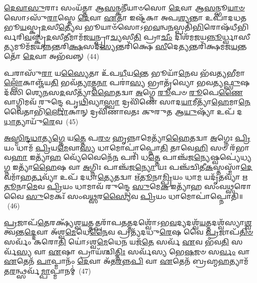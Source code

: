 \-\ul{𑌦𑍇}\-\-\ul{𑌵𑌾}\-\-\ul{𑌸𑍁}\-𑌰𑌾𑌃 𑌸𑌂𑌯᳴𑌤𑍍𑌤𑌾 𑌆\-\ul{𑌸}\-𑌨𑍍𑌕𑌨𑍀᳴𑌯𑌾𑍞𑌸𑍋 \ul{𑌦𑍇}\-𑌵𑌾 𑌆\-\ul{𑌸}\-𑌨𑍍𑌭𑍂\-\ul{𑌯𑌾}\-\-\ul{𑍞}\-𑌸𑍋\-𑌽𑌸𑍁᳴\-\ul{𑌰𑌾}\-𑌸𑍍𑌤𑍇 \ul{𑌦𑍇}\-𑌵𑌾 \ul{𑌏}\-𑌤𑌾 𑌇𑌷𑍍𑌟᳴𑌕𑌾 𑌅𑌪\-\ul{𑌶𑍍𑌯}\-𑌨𑍍𑌤𑌾 𑌉𑌪𑌾᳴𑌦𑌧𑌤 𑌭𑍂\-\ul{𑌯}\-𑌸𑍍𑌕𑍃\-\ul{𑌦}\-𑌸𑍀\-\ul{𑌤𑍍𑌯𑍇}\-𑌵 𑌭𑍂𑌯𑌾𑍞᳴𑌸𑍋\-𑌽𑌭\-\ul{𑌵}\-𑌨𑍍𑌵\-\ul{𑌨}\-𑌸𑍍𑌪𑌤𑌿᳴\-\ul{𑌭𑌿}\-𑌰𑍋𑌷᳴𑌧𑍀𑌭𑌿𑌰𑍍𑌵𑌰𑌿\-\ul{𑌵}\-𑌸𑍍𑌕𑍃\-\ul{𑌦}\-𑌸𑍀\-\ul{𑌤𑍀}\-𑌮𑌾𑌮᳴𑌜\-\ul{𑌯}\-𑌨𑍍𑌪𑍍𑌰𑌾\-\ul{𑌚𑍍𑌯}\-𑌸𑍀\-\ul{𑌤𑌿} 𑌪𑍍𑌰𑌾\-\ul{𑌚𑍀𑌂} 𑌦𑌿𑌶᳴𑌮𑌜𑌯\-\ul{𑌨𑍍𑌨𑍂}\-𑌰𑍍𑌧𑍍𑌵𑌾𑌸𑍀\-\ul{𑌤𑍍𑌯}\-𑌮𑍂𑌮᳴𑌜𑌯𑌨𑍍𑌨𑌨𑍍𑌤𑌰𑌿\-\ul{𑌕𑍍𑌷}\-𑌸𑌦᳴\-\ul{𑌸𑍍𑌯}\-𑌨𑍍𑌤𑌰𑌿᳴𑌕𑍍𑌷𑍇 \ul{𑌸𑍀}\-𑌦𑍇\-\ul{𑌤𑍍𑌯}\-𑌨𑍍𑌤𑌰𑌿᳴𑌕𑍍𑌷𑌮𑌜\-\ul{𑌯}\-𑌨𑍍𑌤𑌤𑍋᳴ \ul{𑌦𑍇}\-𑌵𑌾 𑌅𑌭᳴𑌵𑌨𑍍𑌨𑍍~(44)

𑌪𑌰𑌾𑌸𑍁᳴\-\ul{𑌰𑌾} 𑌯\-\ul{𑌸𑍍𑌯𑍈}\-𑌤𑌾 𑌉᳴𑌪\-\ul{𑌧𑍀}\-𑌯\-\ul{𑌨𑍍𑌤𑍇} 𑌭𑍂𑌯𑌾᳴\-\ul{𑌨𑍇}\-𑌵 𑌭᳴𑌵\-\ul{𑌤𑍍𑌯}\-𑌭𑍀𑌮𑌾\-\ul{𑌲𑍍𑌲𑍋𑌁}\-𑌕𑌾𑌞𑍍𑌜᳴𑌯\-\ul{𑌤𑌿} 𑌭𑌵᳴\-\ul{𑌤𑍍𑌯𑌾}\-𑌤𑍍𑌮\-\ul{𑌨𑌾} 𑌪𑌰𑌾॑\-\ul{𑌸𑍍𑌯} 𑌭𑍍𑌰𑌾𑌤𑍃᳴𑌵𑍍𑌯𑍋 𑌭𑌵𑌤𑍍𑌯\-\ul{𑌫𑍍𑌸𑍁}\-𑌷𑌦᳴𑌸𑌿 𑌶𑍍𑌯𑍇\-\ul{𑌨}\-𑌸\-\ul{𑌦}\-𑌸𑍀𑌤𑍍𑌯𑌾᳴\-\ul{𑌹𑍈}\-𑌤𑌦𑍍𑌵𑌾 \ul{𑌅}\-𑌗𑍍𑌨𑍇 \ul{𑌰𑍂}\-𑌪𑍞 \ul{𑌰𑍂}\-𑌪𑍇\-\ul{𑌣𑍈}\-𑌵𑌾𑌗𑍍𑌨𑌿𑌮𑌵᳴ 𑌰𑍁𑌨𑍍𑌦𑍍𑌧𑍇 𑌪𑍃\-\ul{𑌥𑌿}\-𑌵𑍍𑌯𑌾\-\ul{𑌸𑍍𑌤𑍍𑌵𑌾} 𑌦𑍍𑌰𑌵𑌿᳴𑌣𑍇 𑌸𑌾𑌦\-\ul{𑌯𑌾}\-𑌮𑍀𑌤𑍍𑌯𑌾᳴\-\ul{𑌹𑍇}\-𑌮𑌾\-\ul{𑌨𑍇}\-𑌵𑍈𑌤𑌾𑌭𑌿᳴\-\ul{𑌰𑍍𑌲𑍋}\-𑌕𑌾𑌨𑍍 𑌦𑍍𑌰𑌵𑌿᳴𑌣𑌾𑌵𑌤𑌃 𑌕𑍁𑌰𑍁𑌤 𑌆\-\ul{𑌯𑍁}\-𑌷𑍍𑌯𑌾᳴ 𑌉𑌪᳴ 𑌦\-\ul{𑌧𑌾}\-𑌤𑍍𑌯𑌾𑌯𑍁᳴\-\ul{𑌰𑍇}\-𑌵~(45)

\-\ul{𑌅}\-\-\ul{𑌸𑍍𑌮𑌿}\-\-\ul{𑌨𑍍𑌦}\-\-\ul{𑌧𑌾}\-𑌤𑍍𑌯\-\ul{𑌗𑍍𑌨𑍇} 𑌯\-\ul{𑌤𑍍𑌤𑍇} 𑌪\-\ul{𑌰}\-\-\ul{𑍞} 𑌹𑍃𑌨𑍍𑌨𑌾𑌮𑍇𑌤𑍍𑌯𑌾᳴\-\ul{𑌹𑍈}\-𑌤𑌦𑍍𑌵𑌾 \ul{𑌅}\-𑌗𑍍𑌨𑍇𑌃 \ul{𑌪𑍍𑌰𑌿}\-𑌯𑌂 𑌧𑌾𑌮᳴ \ul{𑌪𑍍𑌰𑌿}\-𑌯\-\ul{𑌮𑍇}\-𑌵𑌾\-\ul{𑌸𑍍𑌯} 𑌧𑌾𑌮𑍋𑌪𑌾॑𑌪𑍍𑌨𑍋\-\ul{𑌤𑌿} 𑌤𑌾𑌵𑍇\-\ul{𑌹𑌿} 𑌸𑍞 𑌰᳴𑌭𑌾𑌵\-\ul{𑌹𑌾} 𑌇𑌤𑍍𑌯𑌾᳴\-\ul{𑌹} 𑌵𑍍𑌯𑍇᳴𑌵𑍈𑌨𑍇᳴\-\ul{𑌨} 𑌪𑌰𑌿᳴ 𑌧\-\ul{𑌤𑍍𑌤𑍇} 𑌪𑌾𑌞𑍍𑌚᳴𑌜\-\ul{𑌨𑍍𑌯𑍇}\-𑌷𑍍𑌵𑌪𑍍𑌯𑍇॑𑌧𑍍𑌯\-\ul{𑌗𑍍𑌨} 𑌇𑌤𑍍𑌯𑌾᳴\-\ul{𑌹𑍈}\-𑌷 𑌵𑌾 \ul{𑌅}\-𑌗𑍍𑌨𑌿𑌃 𑌪𑌾𑌞𑍍𑌚᳴𑌜\-\ul{𑌨𑍍𑌯𑍋} 𑌯𑌃 𑌪𑌞𑍍𑌚᳴𑌚𑌿𑌤𑍀\-\ul{𑌕}\-𑌸𑍍𑌤𑌸𑍍𑌮𑌾᳴\-\ul{𑌦𑍇}\-𑌵𑌮𑌾᳴𑌹\-\ul{𑌰𑍍𑌤}\-𑌵𑍍𑌯𑌾᳴ 𑌉𑌪᳴ 𑌦𑌧𑌾\-\ul{𑌤𑍍𑌯𑍇}\-𑌤𑌦𑍍𑌵𑌾 𑌋᳴\-\ul{𑌤𑍂}\-𑌨𑌾\-\ul{𑌮𑍍𑌪𑍍𑌰𑌿}\-𑌯𑌂 𑌧𑌾\-\ul{𑌮} 𑌯𑌦𑍃᳴\-\ul{𑌤}\-𑌵𑍍𑌯𑌾᳴ 𑌋\-\ul{𑌤𑍂}\-𑌨𑌾\-\ul{𑌮𑍇}\-𑌵 \ul{𑌪𑍍𑌰𑌿}\-𑌯𑌂 𑌧𑌾𑌮𑌾𑌵᳴ 𑌰𑍁𑌨𑍍𑌦𑍍𑌧𑍇 \ul{𑌸𑍁}\-𑌮𑍇\-\ul{𑌕} 𑌇𑌤𑍍𑌯𑌾᳴𑌹 𑌸𑌂𑌵\-\ul{𑌥𑍍𑌸}\-𑌰𑍋 𑌵𑍈 \ul{𑌸𑍁}\-𑌮𑍇𑌕𑌃᳴ 𑌸𑌂𑌵\-\ul{𑌥𑍍𑌸}\-𑌰\-\ul{𑌸𑍍𑌯𑍈}\-𑌵 \ul{𑌪𑍍𑌰𑌿}\-𑌯𑌂 𑌧𑌾𑌮𑍋𑌪𑌾॑𑌪𑍍𑌨𑍋𑌤𑌿॥~(46)

{\anuvakamend[{𑌅𑌭᳴\-\ul{𑌵}\-𑌨𑍍𑌨𑌾𑌯𑍁᳴\-\ul{𑌰𑍇}\-𑌵\-\ul{𑌰𑍍𑌤}\-𑌵𑍍𑌯𑌾᳴ 𑌉\-\ul{𑌪} 𑌷𑌡𑍍𑌵𑌿𑍞᳴𑌶𑌤𑌿𑌶𑍍𑌚}]}%

\-\ul{𑌪𑍍𑌰}\-𑌜𑌾𑌪᳴\-\ul{𑌤𑍇}\-𑌰𑌕𑍍𑌷𑍍𑌯᳴𑌶𑍍𑌵\-\ul{𑌯}\-𑌤𑍍𑌤𑌤𑍍𑌪𑌰𑌾᳴𑌪\-\ul{𑌤}\-𑌤𑍍𑌤𑌦𑌶𑍍𑌵𑍋᳴\-𑌽𑌭\-\ul{𑌵}\-𑌦𑍍𑌯𑌦𑌶𑍍𑌵᳴\-\ul{𑌯}\-𑌤𑍍𑌤𑌦𑌶𑍍𑌵᳴𑌸𑍍𑌯𑌾\-\ul{𑌶𑍍𑌵}\-𑌤𑍍𑌵𑌨𑍍𑌤\-\ul{𑌦𑍍𑌦𑍇}\-𑌵𑌾 𑌅᳴𑌶𑍍𑌵\-\ul{𑌮𑍇}\-𑌧𑍇\-\ul{𑌨𑍈}\-𑌵 𑌪𑍍𑌰𑌤𑍍𑌯᳴𑌦𑌧𑍁\-\ul{𑌰𑍇}\-𑌷 𑌵𑍈 \ul{𑌪𑍍𑌰}\-𑌜𑌾𑌪᳴\-\ul{𑌤𑌿}\-\-\ul{𑍞} 𑌸𑌰𑍍𑌵𑌂᳴ 𑌕𑌰𑍋\-\ul{𑌤𑌿} 𑌯𑍋॑\-𑌽𑌶𑍍𑌵\-\ul{𑌮𑍇}\-𑌧𑍇\-\ul{𑌨} 𑌯𑌜᳴\-\ul{𑌤𑍇} 𑌸𑌰𑍍𑌵᳴ \ul{𑌏}\-𑌵 𑌭᳴𑌵\-\ul{𑌤𑌿} 𑌸𑌰𑍍𑌵᳴\-\ul{𑌸𑍍𑌯} 𑌵𑌾 \ul{𑌏}\-𑌷𑌾 𑌪𑍍𑌰𑌾𑌯᳴𑌶𑍍𑌚𑌿\-\ul{𑌤𑍍𑌤𑌿𑌃} 𑌸𑌰𑍍𑌵᳴𑌸𑍍𑌯 𑌭𑍇\-\ul{𑌷}\-𑌜𑍞 𑌸\-\ul{𑌰𑍍𑌵𑌂} 𑌵𑌾 \ul{𑌏}\-𑌤𑍇𑌨᳴ \ul{𑌪𑌾}\-𑌪𑍍𑌮𑌾𑌨𑌂᳴ \ul{𑌦𑍇}\-𑌵𑌾 𑌅᳴𑌤\-\ul{𑌰}\-𑌨𑍍𑌨\-\ul{𑌪𑌿} 𑌵𑌾 \ul{𑌏}\-𑌤𑍇𑌨᳴ 𑌬𑍍𑌰𑌹𑍍𑌮\-\ul{𑌹}\-𑌤𑍍𑌯𑌾𑌮᳴𑌤\-\ul{𑌰}\-𑌨𑍍𑌥𑍍𑌸𑌰𑍍𑌵᳴\-\ul{𑌮𑍍𑌪𑌾}\-𑌪𑍍𑌮𑌾𑌨𑌮𑍍॑~(47)

